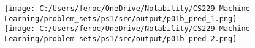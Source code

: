 \begin{answer}
\begin{figure}[h]
  \texttt{[image: C:/Users/feroc/OneDrive/Notability/CS229 Machine Learning/problem\_sets/ps1/src/output/p01b\_pred\_1.png]}
  \texttt{[image: C:/Users/feroc/OneDrive/Notability/CS229 Machine Learning/problem\_sets/ps1/src/output/p01b\_pred\_2.png]}
\end{figure}
\end{answer}
